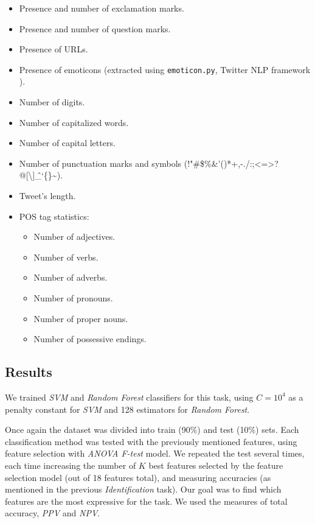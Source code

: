 \documentclass[letterpaper,twocolumn,10pt]{article}
\begin{document}
\begin{itemize}[noitemsep, nolistsep]
	\item Presence and number of exclamation marks.
	\item Presence and number of question marks.
	\item Presence of URLs.
	\item Presence of emoticons (extracted using \texttt{emoticon.py}, Twitter NLP framework \cite{twitter_nlp}).
	\item Number of digits.
	\item Number of capitalized words.
	\item Number of capital letters.
	\item Number of punctuation marks and symbols (!"\#\$\%\&'()*+,-./:;<=>?@[\textbackslash]\^\_`\{\}\textasciitilde).
	\item Tweet's length.
	\item POS tag statistics:
		\begin{itemize}[noitemsep, nolistsep]
			\item Number of adjectives.
			\item Number of verbs.
			\item Number of adverbs.
			\item Number of pronouns.
			\item Number of proper nouns.
			\item Number of possessive endings.
		\end{itemize}
\end{itemize}

\subsection{Results}
We trained \textit{SVM} and \textit{Random Forest} classifiers for this task, using $ C=10^4 $ as a penalty constant for \textit{SVM} and 128 estimators for \textit{Random Forest}.

Once again the dataset was divided into train (90\%) and test (10\%) sets. Each classification method was tested with the previously mentioned features, using feature selection with \textit{ANOVA F-test} model. We repeated the test several times, each time increasing the number of $K$ best features selected by the feature selection model (out of 18 features total), and measuring accuracies (as mentioned in the previous \textit{Identification} task). Our goal was to find which features are the most expressive for the task. We used the measures of total accuracy, \textit{PPV} and \textit{NPV}.
\end{document}

